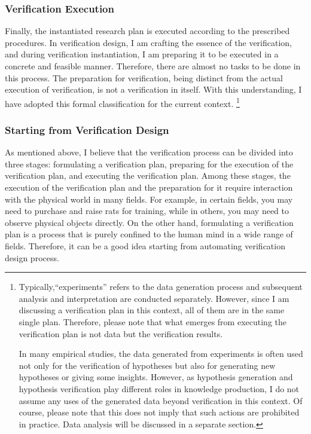 \documentclass{article}
\begin{document}
\subsubsection{Verification Execution}
Finally, the instantiated research plan is executed according to the prescribed procedures. In verification design, I am crafting the essence of the verification, and during verification instantiation, I am preparing it to be executed in a concrete and feasible manner. Therefore, there are almost no tasks to be done in this process. The preparation for verification, being distinct from the actual execution of verification, is not a verification in itself. With this understanding, I have adopted this formal classification for the current context.
\footnote{
Typically,``experiments'' refers to the data generation process and subsequent analysis and interpretation are conducted separately. However, since I am discussing a verification plan in this context, all of them are in the same single plan. Therefore, please note that what emerges from executing the verification plan is not data but the verification results.

In many empirical studies, the data generated from experiments is often used not only for the verification of hypotheses but also for generating new hypotheses or giving some insights. However, as hypothesis generation and hypothesis verification play different roles in knowledge production, I do not assume any uses of the generated data beyond verification in this context. Of course, please note that this does not imply that such actions are prohibited in practice. Data analysis will be discussed in a separate section.
}

\subsubsection{Starting from Verification Design}

As mentioned above, I believe that the verification process can be divided into three stages: formulating a verification plan, preparing for the execution of the verification plan, and executing the verification plan. Among these stages, the execution of the verification plan and the preparation for it require interaction with the physical world in many fields. For example, in certain fields, you may need to purchase and raise rats for training, while in others, you may need to observe physical objects directly. On the other hand, formulating a verification plan is a process that is purely confined to the human mind in a wide range of fields. Therefore, it can be a good idea starting from automating verification design process.
\end{document}
